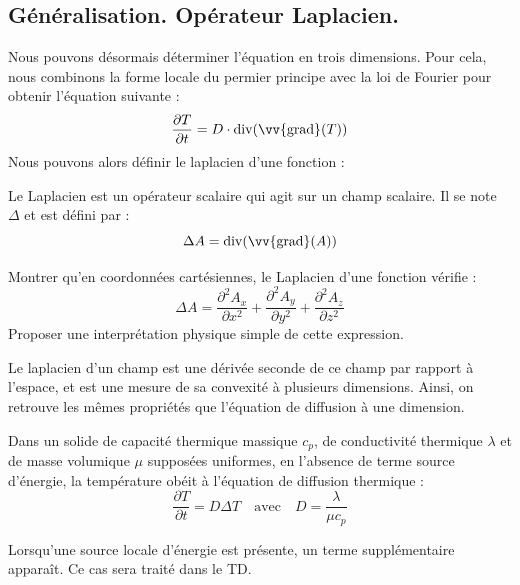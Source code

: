\documentclass[11pt,fleqn]{book} %
\renewcommand{\div}{\mathrm{div}}
\renewcommand{\grad}{\vv{\mathrm{grad}}}
\begin{document}
\subsection{Généralisation. Opérateur Laplacien.}

Nous pouvons désormais déterminer l'équation en trois dimensions. Pour cela, nous combinons la forme locale du permier principe avec la loi de Fourier pour obtenir l'équation suivante :
\begin{equation}
	\frac{\partial T}{\partial t} = D \cdot \div(\grad(T))
\end{equation}
Nous pouvons alors définir le laplacien d'une fonction :
\begin{definition}
	Le Laplacien est un opérateur scalaire qui agit sur un champ scalaire. Il se note $\Delta$ et est défini par :
	\begin{equation}
		\Delta A = \div(\grad(A))
	\end{equation}
\end{definition}

\begin{capex}
	Montrer qu'en coordonnées cartésiennes, le Laplacien d'une fonction vérifie :
	\begin{equation}
		\Delta A = \frac{\partial^2 A_x}{\partial x^2} + \frac{\partial^2 A_y}{\partial y^2} + \frac{\partial^2 A_z}{\partial z^2}
	\end{equation}
	Proposer une interprétation physique simple de cette expression.
\end{capex}

Le laplacien d'un champ est une dérivée seconde de ce champ par rapport à l'espace, et est une mesure de sa convexité à plusieurs dimensions. Ainsi, on retrouve les mêmes propriétés que l'équation de diffusion à une dimension.

\begin{theorem}
	Dans un solide de capacité thermique massique $c_p$, de conductivité thermique $\lambda$ et de masse volumique $\mu$ supposées uniformes, en l'absence de terme source d'énergie, la température obéit à l'équation de diffusion thermique :
	\begin{equation}
		\frac{\partial T}{\partial t} = D \Delta T \quad \mathrm{avec} \quad D = \frac{\lambda}{\mu c_p}
	\end{equation}
\end{theorem}

\begin{remark}
	Lorsqu'une source locale d'énergie est présente, un terme supplémentaire apparaît. Ce cas sera traité dans le TD.
\end{remark}
\end{document}
